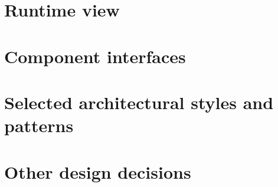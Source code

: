 \section{Runtime view}

\section{Component interfaces}

\section{Selected architectural styles and patterns}

\section{Other design decisions}
